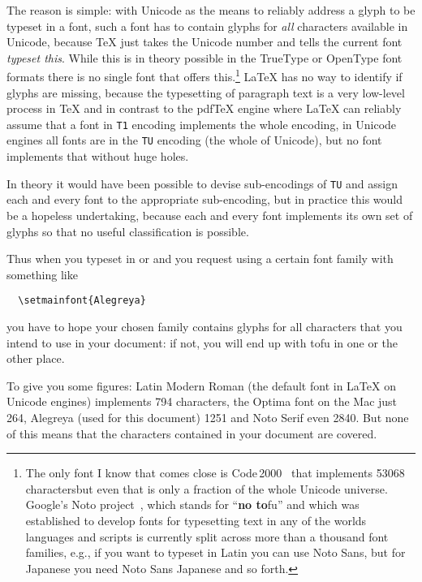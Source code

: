 \documentclass{ltugboat}
\newcommand\pdfTeX{pdf\TeX}
\begin{document}
The reason is simple: with Unicode as the means to reliably address a
glyph to be typeset in a font, such a font has to contain glyphs for
\emph{all} characters available in Unicode, because \TeX{} just takes
the Unicode number and tells the current font \emph{typeset this}.
While this is in theory possible in the TrueType or OpenType font
formats there is no single font that offers this.\footnote{The only
  font I know that comes close is Code\,2000~\cite{web:Code2000} that implements 53068
  characters\Dash but even that is only a fraction of the whole
  Unicode universe.  Google's Noto project~\cite{web:Noto}, which stands for
  \enquote{\textbf{no to}fu} and which was established to develop fonts
  for typesetting text in any of the worlds languages and scripts is
  currently split across more than a thousand font families, e.g., if
  you want to typeset in Latin you can use \textsf{Noto Sans}, but for
  Japanese you need \textsf{Noto Sans Japanese} and so forth.}
\LaTeX{} has no way to identify if glyphs are missing, because the
typesetting of paragraph text is a very low-level process in \TeX{} and
in contrast to the \pdfTeX{} engine where \LaTeX{} can reliably
assume that a font in \texttt{T1} encoding implements the whole
encoding, in Unicode engines all fonts are in the \texttt{TU} encoding
(the whole of Unicode), but no font implements that without huge holes.

In theory it would have been possible to devise sub-encodings of
\texttt{TU} and assign each and every font to the appropriate
sub-encoding, but in practice this would be a hopeless undertaking,
because each and every font implements its own set of glyphs so that
no useful classification is possible.

Thus when you typeset in \XeTeX{} or \LuaTeX{} and you request using a
certain font family with something like
\begin{verbatim}
  \setmainfont{Alegreya}
\end{verbatim}
you have to hope your chosen family contains glyphs for all characters
that you intend to use in your document: if not, you will end up with
tofu in one or the other place.

To give you some figures: \textsf{Latin Modern Roman} (the default
font in \LaTeX{} on Unicode engines) implements 794 characters, the
\textsf{Optima} font on the Mac just 264, \textsf{Alegreya} (used for
this document) 1251 and \textsf{Noto Serif} even 2840. But none of this
means that the characters contained in your document are covered.
\end{document}
